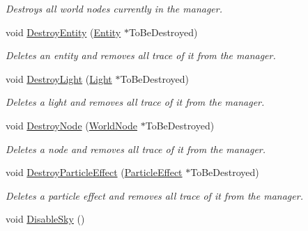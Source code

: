 \begin{DoxyCompactItemize}
\begin{DoxyCompactList}\small\item\em Destroys all world nodes currently in the manager. \item\end{DoxyCompactList}\item 
void \hyperlink{classMezzanine_1_1SceneManager_a87d26a862306dcf859ff0dee2e8a6834}{DestroyEntity} (\hyperlink{classMezzanine_1_1Entity}{Entity} $\ast$ToBeDestroyed)
\begin{DoxyCompactList}\small\item\em Deletes an entity and removes all trace of it from the manager. \item\end{DoxyCompactList}\item 
void \hyperlink{classMezzanine_1_1SceneManager_ad05338bb291dc8535b8f691378682851}{DestroyLight} (\hyperlink{classMezzanine_1_1Light}{Light} $\ast$ToBeDestroyed)
\begin{DoxyCompactList}\small\item\em Deletes a light and removes all trace of it from the manager. \item\end{DoxyCompactList}\item 
void \hyperlink{classMezzanine_1_1SceneManager_ab6123477f052d34a357db85a8284c8be}{DestroyNode} (\hyperlink{classMezzanine_1_1WorldNode}{WorldNode} $\ast$ToBeDestroyed)
\begin{DoxyCompactList}\small\item\em Deletes a node and removes all trace of it from the manager. \item\end{DoxyCompactList}\item 
void \hyperlink{classMezzanine_1_1SceneManager_ad91db10c13517ff6a31be64739ca2f27}{DestroyParticleEffect} (\hyperlink{classMezzanine_1_1ParticleEffect}{ParticleEffect} $\ast$ToBeDestroyed)
\begin{DoxyCompactList}\small\item\em Deletes a particle effect and removes all trace of it from the manager. \item\end{DoxyCompactList}\item 
\hypertarget{classMezzanine_1_1SceneManager_a167309912093d3a2fc438cab5686e2ce}{
void \hyperlink{classMezzanine_1_1SceneManager_a167309912093d3a2fc438cab5686e2ce}{DisableSky} ()}
\label{classMezzanine_1_1SceneManager_a167309912093d3a2fc438cab5686e2ce}


\end{DoxyCompactItemize}
